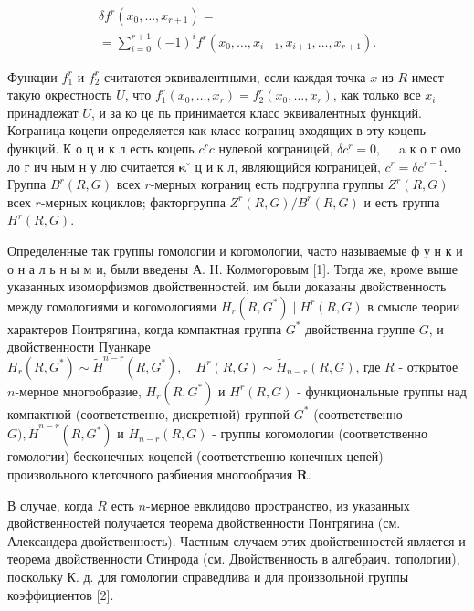 \documentclass[10pt]{article}
\begin{document}
\[

\begin{gathered}

\delta f^{r}\left(x_{0}, \ldots, x_{r+1}\right)= \\

=\sum_{i=0}^{r+1}(-1)^{i} f^{r}\left(x_{0}, \ldots, x_{i-1}, x_{i+1}, \ldots, x_{r+1}\right) .

\end{gathered}

\]



Функции $f_{1}^{r}$ и $f_{2}^{r}$ считаются эквивалентными, если каждая точка $x$ из $R$ имеет такую окрестность $U$, что $f_{1}^{r}\left(x_{0}, \ldots, x_{r}\right)=f_{2}^{r}\left(x_{0}, \ldots, x_{r}\right)$, как только все $x_{i}$ принадлежат $U$, и за ко це пь принимается класс эквивалентных функций. Кограница коцепи определяется как класс кограниц входящих в эту коцепь функций. К о ц и к л есть коцепь $c^{r} c$ нулевой кограницей, $\delta c^{r}=0, \quad$ a к о г омо ло г ич ным н у лю считается $\boldsymbol{\kappa}^{\circ}$ ц и к л, являющийся кограницей, $c^{r}=\delta c^{r-1}$. Группа $B^{r}(R, G)$ всех $r$-мерных кограниц есть подгруппа группы $Z^{r}(R, G)$ всех $r$-мерных коциклов; факторгруппа $Z^{r}(R, G) / B^{r}(R, G)$ и есть группа $H^{r}(R, G)$.



Определенные так группы гомологии и когомологии, часто называемые ф у н к и о н а л ь н ы м и, были введены А. Н. Колмогоровым [1]. Тогда же, кроме выше указанных изоморфизмов двойственностей, им были доказаны двойственность между гомологиями и когомологиями $H_{r}\left(R, G^{*}\right) \mid H^{r}(R, G)$ в смысле теории характеров Понтрягина, когда компактная группа $G^{*}$ двойственна группе $G$, и двойственности Пуанкаре $H_{r}\left(R, G^{*}\right) \sim \tilde{H}^{n-r}\left(R, G^{*}\right), \quad H^{r}(R, G) \sim \tilde{H}_{n-r}(R, G)$, где $R$ - открытое $n$-мерное многообразие, $H_{r}\left(R, G^{*}\right)$ и $H^{r}(R, G)$ - функциональные группы над компактной (соответственно, дискретной) группой $G^{*}$ (соответственно $G), \tilde{H}^{n-r}\left(R, G^{*}\right)$ и $\tilde{H}_{n-r}(R, G)$ - группы когомологии (соответственно гомологии) бесконечных коцепей (соответственно конечных цепей) произвольного клеточного разбиения многообразия $\boldsymbol{R}$.



В случае, когда $R$ есть $n$-мерное евклидово пространство, из указанных двойственностей получается теорема двойственности Понтрягина (см. Александера двойственность). Частным случаем этих двойственностей является и теорема двойственности Стинрода (см. Двойственность в алгебраич. топологии), поскольку К. д. для гомологии справедлива и для произвольной группы коэффициентов [2].
\end{document}
